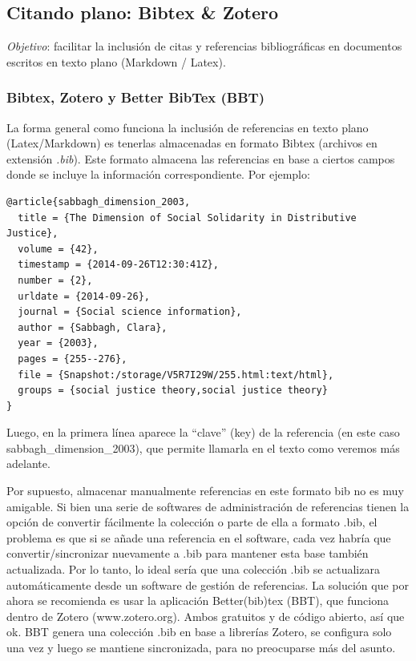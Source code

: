 \documentclass[11pt,]{book}
\begin{document}
\hypertarget{citando-plano-bibtex-zotero}{%
\subsection{Citando plano: Bibtex \& Zotero}\label{citando-plano-bibtex-zotero}}

\emph{Objetivo}: facilitar la inclusión de citas y referencias bibliográficas en documentos escritos en texto plano (Markdown / Latex).

\hypertarget{bibtex-zotero-y-better-bibtex-bbt}{%
\subsubsection{Bibtex, Zotero y Better BibTex (BBT)}\label{bibtex-zotero-y-better-bibtex-bbt}}

La forma general como funciona la inclusión de referencias en texto plano (Latex/Markdown) es tenerlas almacenadas en formato Bibtex (archivos en extensión \emph{.bib}). Este formato almacena las referencias en base a ciertos campos donde se incluye la información correspondiente. Por ejemplo:

\begin{verbatim}
@article{sabbagh_dimension_2003,
  title = {The Dimension of Social Solidarity in Distributive Justice},
  volume = {42},
  timestamp = {2014-09-26T12:30:41Z},
  number = {2},
  urldate = {2014-09-26},
  journal = {Social science information},
  author = {Sabbagh, Clara},
  year = {2003},
  pages = {255--276},
  file = {Snapshot:/storage/V5R7I29W/255.html:text/html},
  groups = {social justice theory,social justice theory}
}
\end{verbatim}

Luego, en la primera línea aparece la ``clave'' (key) de la referencia (en este caso sabbagh\_dimension\_2003), que permite llamarla en el texto como veremos más adelante.

Por supuesto, almacenar manualmente referencias en este formato bib no es muy amigable. Si bien una serie de softwares de administración de referencias tienen la opción de convertir fácilmente la colección o parte de ella a formato .bib, el problema es que si se añade una referencia en el software, cada vez habría que convertir/sincronizar nuevamente a .bib para mantener esta base también actualizada. Por lo tanto, lo ideal sería que una colección .bib se actualizara automáticamente desde un software de gestión de referencias. La solución que por ahora se recomienda es usar la aplicación Better(bib)tex (BBT), que funciona dentro de Zotero (www.zotero.org). Ambos gratuitos y de código abierto, así que ok. BBT genera una colección .bib en base a librerías Zotero, se configura solo una vez y luego se mantiene sincronizada, para no preocuparse más del asunto.
\end{document}
